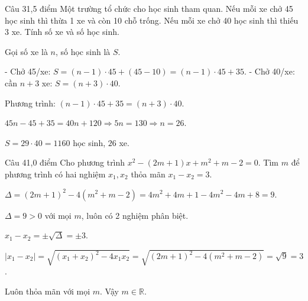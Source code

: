 \begin{de_cau}{Câu 3}{1,5 điểm}
Một trường tổ chức cho học sinh tham quan. Nếu mỗi xe chở 45 học sinh thì thừa 1 xe và còn 10 chỗ
trống. Nếu mỗi xe chở 40 học sinh thì thiếu 3 xe. Tính số xe và số học sinh.
\end{de_cau}

\begin{loi_giai_cau}
Gọi số xe là $n$, số học sinh là $S$.

- Chở 45/xe: $S=(n-1)\cdot 45+(45-10)=(n-1)\cdot 45+35$.
- Chở 40/xe: cần $n+3$ xe: $S=(n+3)\cdot 40$.

Phương trình: $(n-1)\cdot 45+35=(n+3)\cdot 40$.

$45n-45+35=40n+120\Rightarrow 5n=130\Rightarrow n=26$.

$S=29\cdot 40=1160$ học sinh, $26$ xe.
\end{loi_giai_cau}

\begin{de_cau}{Câu 4}{1,0 điểm}
Cho phương trình $x^2-(2m+1)x+m^2+m-2=0$. Tìm $m$ để phương trình có hai nghiệm $x_1, x_2$
thỏa mãn $x_1-x_2=3$.
\end{de_cau}

\begin{loi_giai_cau}
$\Delta=(2m+1)^2-4(m^2+m-2)=4m^2+4m+1-4m^2-4m+8=9$.

$\Delta=9>0$ với mọi $m$, luôn có 2 nghiệm phân biệt.

$x_1-x_2=\pm\sqrt{\Delta}=\pm 3$.

$|x_1-x_2|=\sqrt{(x_1+x_2)^2-4x_1x_2}=\sqrt{(2m+1)^2-4(m^2+m-2)}=\sqrt{9}=3$.

Luôn thỏa mãn với mọi $m$. Vậy $m\in\mathbb{R}$.
\end{loi_giai_cau}
